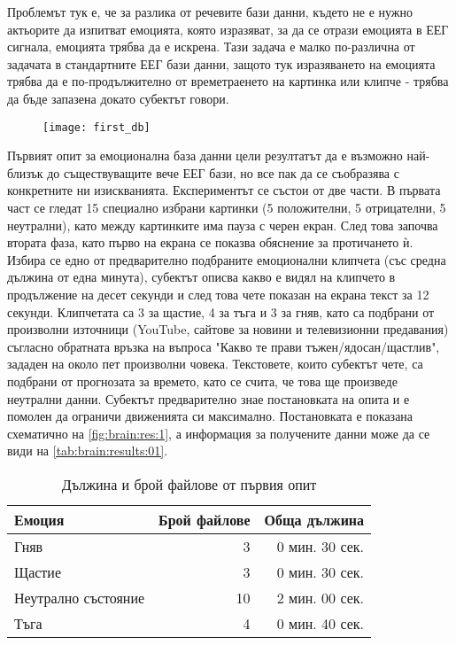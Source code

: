 \documentclass[main.tex]{subfiles}
\begin{document}
Проблемът тук е, че за разлика от речевите бази данни, където не е нужно актьорите да изпитват емоцията, която изразяват, за да се отрази емоцията в ЕЕГ сигнала, емоцията трябва да е искрена. Тази задача е малко по-различна от задачата в стандартните ЕЕГ бази данни, защото тук изразяването на емоцията трябва да е по-продължително от времетраенето на картинка или клипче - трябва да бъде запазена докато субектът говори.

\begin{figure}[ht]%
    \texttt{[image: first\_db]}%
    \caption{}
    \label{fig:brain:res:1}
\end{figure}

Първият опит за емоционална база данни цели резултатът да е възможно най-близък до съществуващите вече ЕЕГ бази, но все пак да се съобразява с конкретните ни изискванията. Експериментът се състои от две части.
В първата част се гледат 15 специално избрани картинки (5 положителни, 5 отрицателни, 5 неутрални), като между картинките има пауза с черен екран. След това започва втората фаза, като първо на екрана се показва обяснение за протичането ѝ. Избира се едно от предварително подбраните емоционални клипчета (със средна дължина от една минута), субектът описва какво е видял на клипчето в продължение на десет секунди и след това чете показан на екрана текст за 12 секунди.
Клипчетата са 3 за щастие, 4 за тъга и 3 за гняв, като са подбрани от произволни източници (YouTube, сайтове за новини и телевизионни предавания) съгласно обратната връзка на въпроса "Какво те прави тъжен/ядосан/щастлив", зададен на около пет произволни човека. Текстовете, които субектът чете, са подбрани от прогнозата за времето, като се счита, че това ще произведе неутрални данни.
Субектът предварително знае постановката на опита и е помолен да ограничи движенията си максимално. Постановката е показана схематично на \autoref{fig:brain:res:1}, а информация за получените данни може да се види на \autoref{tab:brain:results:01}.

\begin{table}[h]
    \begin{center}
    \begin{tabular}{|l|r|r|} 
        \hline
        Емоция & Брой файлове & Обща дължина\\ 
        \hline
        Гняв & 3 & 0 мин. 30 сек.\\ 
        Щастие & 3 & 0 мин. 30 сек.\\ 
        Неутрално състояние & 10 & 2 мин. 00 сек. \\ 
        Тъга & 4 & 0 мин. 40 сек. \\ 
        \hline
    \end{tabular}
    \caption{Дължина и брой файлове от първия опит}
    \label{tab:brain:results:01}
    \end{center}
\end{table}
\end{document}
